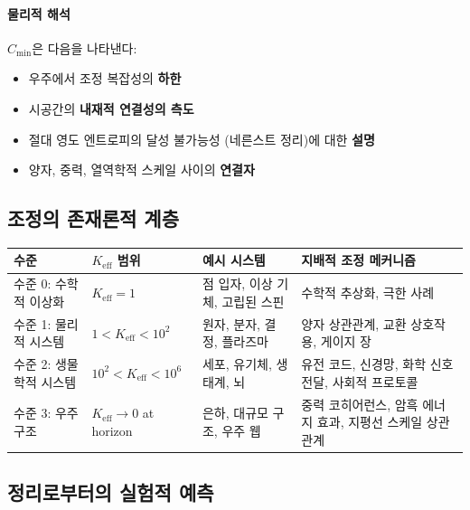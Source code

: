 \documentclass[11pt,a4paper]{article}
\begin{document}
\paragraph{물리적 해석}
$C_{\min}$은 다음을 나타낸다:
\begin{itemize}
	\item 우주에서 조정 복잡성의 \textbf{하한}
	\item 시공간의 \textbf{내재적 연결성의 측도}
	\item 절대 영도 엔트로피의 달성 불가능성 (네른스트 정리)에 대한 \textbf{설명}
	\item 양자, 중력, 열역학적 스케일 사이의 \textbf{연결자}
\end{itemize}

\subsection{조정의 존재론적 계층}

\begin{table}[htbp]
	\centering
	\small
	\begin{tabular}{|p{}|p{}|p{}|p{}|}
		\hline
		\textbf{수준} & \textbf{$K_{\mathrm{eff}}$ 범위} & \textbf{예시 시스템} & \textbf{지배적 조정 메커니즘} \\
		\hline
		수준 0: 수학적 이상화 & $K_{\mathrm{eff}} = 1$ & 점 입자, 이상 기체, 고립된 스핀 & 수학적 추상화, 극한 사례 \\
		\hline
		수준 1: 물리적 시스템 & $1 < K_{\mathrm{eff}} < 10^2$ & 원자, 분자, 결정, 플라즈마 & 양자 상관관계, 교환 상호작용, 게이지 장 \\
		\hline
		수준 2: 생물학적 시스템 & $10^2 < K_{\mathrm{eff}} < 10^6$ & 세포, 유기체, 생태계, 뇌 & 유전 코드, 신경망, 화학 신호전달, 사회적 프로토콜 \\
		\hline
		수준 3: 우주 구조 & $K_{\mathrm{eff}} \to 0$ at horizon & 은하, 대규모 구조, 우주 웹 & 중력 코히어런스, 암흑 에너지 효과, 지평선 스케일 상관관계 \\
		\hline
	\end{tabular}
\end{table}

\begin{table}
\caption{조정 효율에 따른 시스템의 존재론적 계층. 각 수준은 질적으로 다른 조정 메커니즘을 나타내지만 동일한 보편 경계 $K_{\mathrm{eff}} > C_{\min}$을 따른다.}
\label{tab:ontology-hierarchy}
\end{table}

\subsection{정리로부터의 실험적 예측}
\end{document}
